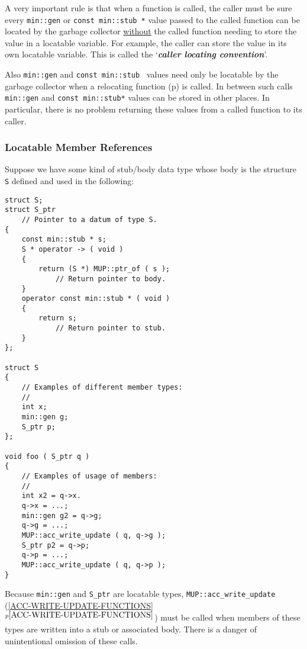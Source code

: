 \documentclass[12pt]{article}
\newcommand{\key}[1]{{\bf \em #1}\index{#1}}
\newcommand{\itemref}[1]{\ref{#1}$^{p\pageref{#1}}$}
\newcommand{\pagref}[1]{p\pageref{#1}}
\newcommand{\EOL}{\penalty \exhyphenpenalty}
\newenvironment{indpar}[1][0.3in]%
	{\begin{list}{}%
		     {\setlength{\itemsep}{0in}%
		      \setlength{\topsep}{0in}%
		      \setlength{\parsep}{1ex}%
		      \setlength{\labelwidth}{#1}%
		      \setlength{\leftmargin}{#1}%
		      \addtolength{\leftmargin}{\labelsep}}%
	 \item}%
	{\end{list}}
\begin{document}
A very important rule is that when a function is called, the caller
must be sure every \verb|min::gen|
or {\tt const min::\EOL stub~*} value passed to the called
function can be located by the garbage collector \underline{without} the called
function needing to store the value in a locatable variable.
For example, the caller can store the value in its own locatable
variable.  This is called the `\key{caller locating convention}'.

Also \verb|min::gen| and {\tt const min::\EOL stub~}
values need only be locatable by
the garbage collector when a relocating function (\pagref{RELOCATING-FUNCTIONS})
is called.  In between such calls \verb|min::gen|
and {\tt const min::\EOL stub*} values can be
stored in other places.  In particular, there is no problem
returning these values from a called function to its caller.

\subsubsection{Locatable Member References}
\label{LOCATABLE-MEMBER-REFERENCES}

Suppose we have some kind of stub/body data type whose body
is the structure {\tt S} defined and used in the following:

\begin{indpar}\begin{verbatim}
struct S;
struct S_ptr
    // Pointer to a datum of type S.
{
    const min::stub * s;
    S * operator -> ( void )
    {
        return (S *) MUP::ptr_of ( s );
            // Return pointer to body.
    }
    operator const min::stub * ( void )
    {
        return s;
            // Return pointer to stub.
    }
};

struct S
{
    // Examples of different member types:
    //
    int x;
    min::gen g;
    S_ptr p;
};

void foo ( S_ptr q )
{
    // Examples of usage of members:
    //
    int x2 = q->x.
    q->x = ...;
    min::gen g2 = q->g;
    q->g = ...;
    MUP::acc_write_update ( q, q->g );
    S_ptr p2 = q->p;
    q->p = ...;
    MUP::acc_write_update ( q, q->p );
}
\end{verbatim}\end{indpar}

Because {\tt min::gen} and {\tt S\_ptr} are locatable types,
{\tt MUP::\EOL acc\_\EOL write\_\EOL update}
(\itemref{ACC-WRITE-UPDATE-FUNCTIONS}) must be called when
members of these types are written into a stub or associated body.  There is
a danger of unintentional omission of these calls.
\end{document}
